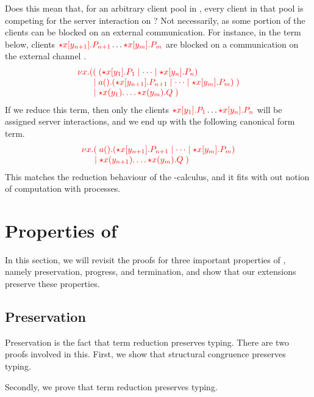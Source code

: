 Does this mean that, for an arbitrary client pool  in
, every client in that pool is competing for
the server interaction on ?
Not necessarily, as some portion of the clients can be blocked on an external
communication. For instance, in the term below, clients
$\textcolor{red}{{\star}{x}[y_{n+1}].P_{n+1}} \dots \textcolor{red}{{\star}{x}[y_m].P_m}$ are blocked
on a communication on the external channel .
\[
  \arraycolsep=0pt
  \tm{
  \begin{array}{lrl}
    \nu x.&  ((&\; \ncPool{\ncCnt{x}{y_1}{P_1}}{\dots\mid\ncCnt{x}{y_n}{P_n}}\\
          &\mid&\; \cpWait{a}{\ncPool{\ncCnt{x}{y_{n+1}}{P_{n+1}}}{\dots \mid \ncCnt{x}{y_m}{P_m}}}\;)\\
          &\mid&\; \ncSrv{x}{y_1}{\dots\ncSrv{x}{y_m}{Q}}\;)
  \end{array}}
\]
If we reduce this term, then only the clients
$\textcolor{red}{{\star}{x}[y_1].P_1} \dots \textcolor{red}{{\star}{x}[y_n].P_n}$
will be assigned server interactions, and we end up with the following canonical
form term. 
\[
  \arraycolsep=0pt
  \tm{
  \begin{array}{lrl}
    \nu x.&   (&\; \cpWait{a}{\ncPool{\ncCnt{x}{y_{n+1}}{P_{n+1}}}{\dots\mid\ncCnt{x}{y_m}{P_m}}}\\
          &\mid&\; \ncSrv{x}{y_{n+1}}{\dots\ncSrv{x}{y_m}{Q}}\;)
  \end{array}}
\]
This matches the reduction behaviour of the \textpi-calculus, and it fits with
out notion of computation with processes.

\section{Properties of \nodcap}\label{sec:nc-properties}
In this section, we will revisit the proofs for three important properties of
\rcp, namely preservation, progress, and termination, and show that our
extensions preserve these properties.

\subsection{Preservation}
Preservation is the fact that term reduction preserves typing. There are two
proofs involved in this. First, we show that structural congruence preserves
typing.


Secondly, we prove that term reduction preserves typing.




